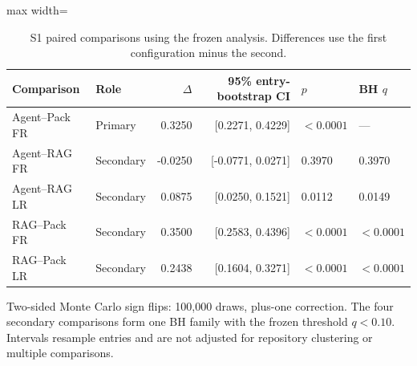 \begin{table}[t]
\centering
\caption{S1 paired comparisons using the frozen analysis. Differences use the first configuration minus the second.}\label{tab:contrasts}
\small
\begin{adjustbox}{max width=\textwidth}\begin{tabular}{llrrll}
\toprule
Comparison & Role & $\Delta$ & 95\% entry-bootstrap CI & $p$ & BH $q$ \\
\midrule
Agent--Pack FR & Primary & 0.3250 & [0.2271, 0.4229] & $<0.0001$ & --- \\
Agent--RAG FR & Secondary & -0.0250 & [-0.0771, 0.0271] & 0.3970 & 0.3970 \\
Agent--RAG LR & Secondary & 0.0875 & [0.0250, 0.1521] & 0.0112 & 0.0149 \\
RAG--Pack FR & Secondary & 0.3500 & [0.2583, 0.4396] & $<0.0001$ & $<0.0001$ \\
RAG--Pack LR & Secondary & 0.2438 & [0.1604, 0.3271] & $<0.0001$ & $<0.0001$ \\
\bottomrule
\end{tabular}\end{adjustbox}
\par\vspace{3pt}\begin{minipage}{\textwidth}\footnotesize Two-sided Monte Carlo sign flips: 100,000 draws, plus-one correction. The four secondary comparisons form one BH family with the frozen threshold $q<0.10$. Intervals resample entries and are not adjusted for repository clustering or multiple comparisons.\end{minipage}
\end{table}
